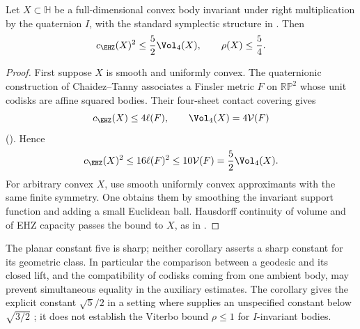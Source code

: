 \begin{corollary}\label{cor:I-symmetric}
Let $X\subset\mathbb H$ be a full-dimensional convex body invariant
under right multiplication by the quaternion $I$, with the standard
symplectic structure in \cite{CT2026}. Then
\[
 c_{\EHZ}(X)^2\leq\frac52\Vol_4(X),\qquad
 \rho(X)\leq\frac54.
\]
\end{corollary}
\begin{proof}
First suppose $X$ is smooth and uniformly convex. The quaternionic
construction of Chaidez--Tanny associates a Finsler metric $F$ on
$\mathbb{RP}^2$ whose unit codisks are affine squared bodies. Their
four-sheet contact covering gives
\[
 c_{\EHZ}(X)\leq4\ell(F),\qquad
 \Vol_4(X)=4\mathcal V(F)
\]
(\cite[Theorem~4.4 and equations~(5.2)--(5.3)]{CT2026}). Hence
\[
 c_{\EHZ}(X)^2\leq16\ell(F)^2
 \leq10\mathcal V(F)=\frac52\Vol_4(X).
\]
For arbitrary convex $X$, use smooth uniformly convex approximants with
the same finite symmetry. One obtains them by smoothing the invariant
support function and adding a small Euclidean ball. Hausdorff continuity
of volume and of EHZ capacity passes the bound to $X$, as in
\cite[Remark~5.4]{CT2026}.
\end{proof}

The planar constant five is sharp; neither corollary asserts a sharp
constant for its geometric class. In particular the comparison between a
geodesic and its closed lift, and the compatibility of codisks coming from
one ambient body, may prevent simultaneous equality in the auxiliary
estimates. The corollary gives the explicit constant $\sqrt5/2$ in a setting where
\cite[Theorem~11]{CT2026} supplies an unspecified constant below $\sqrt{3/2}$ ; it does not
establish the Viterbo bound $\rho\leq1$ for $I$-invariant bodies.
